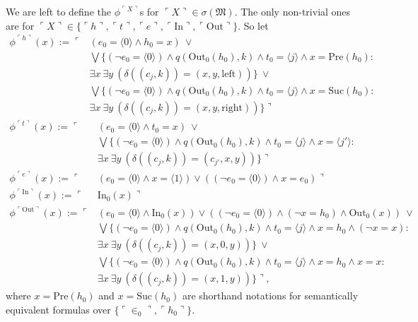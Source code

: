 \documentclass[12pt]{article}
\numberwithin{equation}{section}
\begin{document}
\begin{ex}
We are left to define the $\phi^{\ulcorner X \urcorner}$s for $\ulcorner X \urcorner \in \sigma(\mathfrak{M})$. The only non-trivial ones are for $\ulcorner X \urcorner \in \{\ulcorner h \urcorner, \ulcorner t \urcorner, \ulcorner e \urcorner, \ulcorner \mathrm{In} \urcorner, \ulcorner \mathrm{Out} \urcorner\}$. So let
\begin{align*}
    \phi^{\ulcorner h \urcorner}(x) := \ulcorner & (e_0 = \langle 0 \rangle \wedge h_0 = x) \ \vee \\
    & \bigvee \{(\neg e_0 = \langle 0 \rangle) \wedge q(\mathrm{Out}_0(h_0), k) \wedge t_0 \! = \! \langle j \rangle \wedge x = \mathrm{Pre}(h_0) : \\
    & \exists x \ \exists y \ (\delta((c_j, k)) = (x, y, \mathrm{left}))\} \ \vee \\ 
    & \bigvee \{(\neg e_0 = \langle 0 \rangle) \wedge q(\mathrm{Out}_0(h_0), k) \wedge t_0 \! = \! \langle j \rangle \wedge x = \mathrm{Suc}(h_0) : \\
    & \exists x \ \exists y \ (\delta((c_j, k)) = (x, y, \mathrm{right}))\} \urcorner
\end{align*}
\begin{align*}
    \phi^{\ulcorner t \urcorner}(x) := \ulcorner & (e_0 = \langle 0 \rangle \wedge t_0 = x) \ \vee \\
    & \bigvee \{(\neg e_0 = \langle 0 \rangle) \wedge q(\mathrm{Out}_0(h_0), k) \wedge t_0 \! = \! \langle j \rangle \wedge x = \langle j' \rangle : \\
    & \exists x \ \exists y \ (\delta((c_j, k)) = (c_{j'}, x, y))\} \urcorner \\
    \phi^{\ulcorner e \urcorner}(x) := \ulcorner & (e_0 = \langle 0 \rangle \wedge x = \langle 1 \rangle) \vee ((\neg e_0 = \langle 0 \rangle) \wedge x = e_0) \urcorner \\
    \phi^{\ulcorner \mathrm{In} \urcorner}(x) := \ulcorner & \mathrm{In}_0(x) \urcorner \\
    \phi^{\ulcorner \mathrm{Out} \urcorner}(x) := \ulcorner & (e_0 = \langle 0 \rangle \wedge \mathrm{In}_0(x)) \vee ((\neg e_0 = \langle 0 \rangle) \wedge (\neg x = h_0) \wedge \mathrm{Out}_0(x)) \ \vee \\
    & \bigvee \{(\neg e_0 = \langle 0 \rangle) \wedge q(\mathrm{Out}_0(h_0), k) \wedge t_0 \! = \! \langle j \rangle \wedge x = h_0 \wedge (\neg x = x) : \\
    & \exists x \ \exists y \ (\delta((c_j, k)) = (x, 0, y))\} \ \vee \\
    & \bigvee \{(\neg e_0 = \langle 0 \rangle) \wedge q(\mathrm{Out}_0(h_0), k) \wedge t_0 \! = \! \langle j \rangle \wedge x = h_0 \wedge x = x : \\
    & \exists x \ \exists y \ (\delta((c_j, k)) = (x, 1, y))\} \urcorner \text{,}
\end{align*}
where $x = \mathrm{Pre}(h_0)$ and $x = \mathrm{Suc}(h_0)$ are shorthand notations for semantically equivalent formulas over $\{\ulcorner \in_0 \urcorner, \ulcorner h_0 \urcorner\}$. 


\end{ex}
\end{document}
